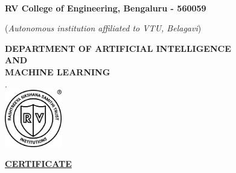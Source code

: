 \thispagestyle{empty}
\vspace{-1cm}
\begin{center}
{\Large\textbf{RV College of Engineering\textsuperscript{\small\textregistered}, Bengaluru - 560059}}
\par
{\large{(\textit{Autonomous institution affiliated to VTU, Belagavi})}} \par
{\large\textbf{DEPARTMENT OF ARTIFICIAL INTELLIGENCE \\ AND \\ MACHINE LEARNING}\\
.\hspace{2cm}\\}
\includegraphics[width=2.5cm]{Figures/image3.png}\par
\Large\textbf{\underline{CERTIFICATE}} \par
\end{center}
